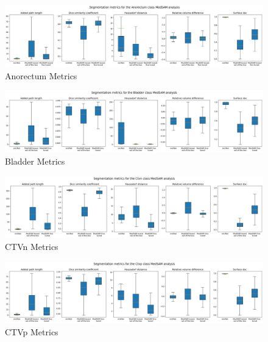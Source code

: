 \documentclass[11pt,twoside]{report}
\begin{document}
\begin{landscape}

  \begin{figure}[H]
    \centering
    \includegraphics[width=\linewidth]{../../research/source/code/data/metrics/metricsanorectum_1_combinednotable_MedSAM_analysis.png}
    \caption{Anorectum Metrics}\label{fig:medsam-metrics-anorectum}
  \end{figure}

  \begin{figure}[H]
    \centering
    \includegraphics[width=\linewidth]{../../research/source/code/data/metrics/metricsbladder_1_combinednotable_MedSAM_analysis.png}
    \caption{Bladder Metrics}\label{fig:medsam-metrics-bladder}
  \end{figure}

  \begin{figure}[H]
    \centering
    \includegraphics[width=\linewidth]{../../research/source/code/data/metrics/metricsctvn_1_combinednotable_MedSAM_analysis.png}
    \caption{CTVn Metrics}\label{fig:medsam-metrics-ctvn}
  \end{figure}

  \begin{figure}[H]
    \centering
    \includegraphics[width=\linewidth]{../../research/source/code/data/metrics/metricsctvp_1_combinednotable_MedSAM_analysis.png}
    \caption{CTVp Metrics}\label{fig:medsam-metrics-ctvp}
  \end{figure}


\end{landscape}
\end{document}
